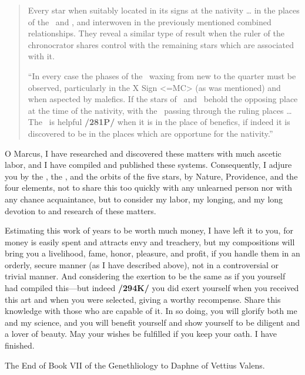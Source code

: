 \begin{quote}
Every star when suitably located in its signs at the nativity … in the places of the \Sun\, and \Moon, and interwoven in the previously mentioned combined relationships. They reveal a similar type of result when the ruler of the chronocrator shares control with the remaining
stars which are associated with it.

“In every case the phases of the \Moon\, waxing from new to the quarter must be observed, particularly in the X Sign <=MC> (as was mentioned) and when aspected by malefics. If the stars of
\Mars\, and \Saturn\, behold the opposing place at the time of the nativity, with the \Moon\, passing through the ruling places … The \Moon\, is helpful \textbf{/281P/} when it is in the place of benefics, if indeed it is discovered to be in the places which are opportune for the nativity.”
\end{quote}

O Marcus, I have researched and discovered these matters with much ascetic labor, and I have compiled and published these systems. Consequently, I adjure you by the \Sun, the \Moon, and the orbits of the five stars, by Nature, Providence, and the four elements, not to share this too quickly with any unlearned person nor with any chance acquaintance, but to consider my labor, my longing, and my long devotion to and research of these matters. 

Estimating this work of years to be worth much money, I have left it to you, for money is easily spent and attracts envy and treachery, but my compositions will bring you a livelihood, fame, honor, pleasure, and profit, if you handle them in an orderly, secure manner (as I have described above), not in a controversial or trivial manner. And considering the exertion to be the same as if you yourself had compiled this—but indeed \textbf{/294K/} you did exert yourself when you received this art and when you were selected, giving a worthy recompense. Share this knowledge with those who are capable of it. In so doing, you will glorify both me and my science, and you will benefit yourself and show yourself to be diligent and a lover of beauty.
May your wishes be fulfilled if you keep your oath. I have finished.

The End of Book VII of the Genethliology to Daphne of Vettius Valens.

\newpage